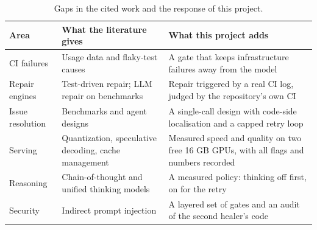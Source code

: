 \begin{table}[!htbp]
\centering
\small
\begin{tabularx}{\linewidth}{>{\raggedright\arraybackslash}p{4.2cm} >{\raggedright\arraybackslash}X >{\raggedright\arraybackslash}X}
\toprule
\textbf{Area} & \textbf{What the literature gives} & \textbf{What this project adds} \\
\midrule
CI failures & Usage data and flaky-test causes \cite{hilton16,luo14} & A gate that keeps infrastructure failures away from the model \\
Repair engines & Test-driven repair; LLM repair on benchmarks \cite{legoues12,xia23} & Repair triggered by a real CI log, judged by the repository's own CI \\
Issue resolution & Benchmarks and agent designs \cite{jimenez24,yang24,xia25} & A single-call design with code-side localisation and a capped retry loop \\
Serving & Quantization, speculative decoding, cache management \cite{frantar22,leviathan23,kwon23} & Measured speed and quality on two free 16 GB GPUs, with all flags and numbers recorded \\
Reasoning & Chain-of-thought and unified thinking models \cite{wei22,qwen3} & A measured policy: thinking off first, on for the retry \\
Security & Indirect prompt injection \cite{greshake23,owasp-llm} & A layered set of gates and an audit of the second healer's code \\
\bottomrule
\end{tabularx}
\caption{Gaps in the cited work and the response of this project.}
\label{tab:gaps}
\end{table}
